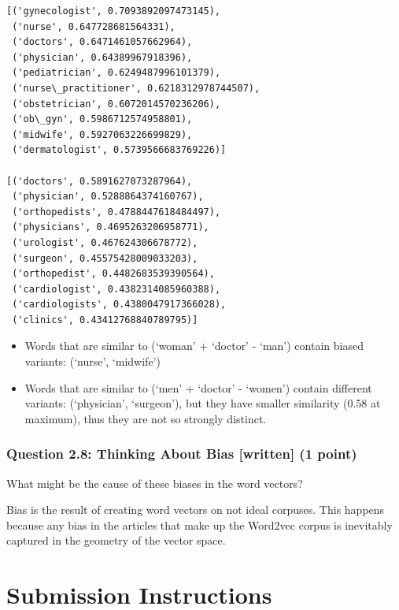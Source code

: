 \documentclass[11pt]{article}
\providecommand{\tightlist}{%
      \setlength{\itemsep}{0pt}\setlength{\parskip}{0pt}}
\begin{document}
    \begin{Verbatim}[commandchars=\\\{\}]
[('gynecologist', 0.7093892097473145),
 ('nurse', 0.647728681564331),
 ('doctors', 0.6471461057662964),
 ('physician', 0.64389967918396),
 ('pediatrician', 0.6249487996101379),
 ('nurse\_practitioner', 0.6218312978744507),
 ('obstetrician', 0.6072014570236206),
 ('ob\_gyn', 0.5986712574958801),
 ('midwife', 0.5927063226699829),
 ('dermatologist', 0.5739566683769226)]

[('doctors', 0.5891627073287964),
 ('physician', 0.5288864374160767),
 ('orthopedists', 0.4788447618484497),
 ('physicians', 0.4695263206958771),
 ('urologist', 0.467624306678772),
 ('surgeon', 0.45575428009033203),
 ('orthopedist', 0.4482683539390564),
 ('cardiologist', 0.4382314085960388),
 ('cardiologists', 0.4380047917366028),
 ('clinics', 0.43412768840789795)]

    \end{Verbatim}

    \begin{itemize}
\tightlist
\item
  Words that are similar to (`woman' + `doctor' - `man') contain biased
  variants: (`nurse', `midwife')
\item
  Words that are similar to (`men' + `doctor' - `women') contain
  different variants: (`physician', `surgeon'), but they have smaller
  similarity (0.58 at maximum), thus they are not so strongly distinct.
\end{itemize}

    \hypertarget{question-2.8-thinking-about-bias-written-1-point}{%
\subsubsection{Question 2.8: Thinking About Bias {[}written{]} (1
point)}\label{question-2.8-thinking-about-bias-written-1-point}}

What might be the cause of these biases in the word vectors?

    Bias is the result of creating word vectors on not ideal corpuses. This
happens because any bias in the articles that make up the Word2vec
corpus is inevitably captured in the geometry of the vector space.

    \hypertarget{submission-instructions}{%
\section{ Submission Instructions}\label{submission-instructions}}
\end{document}

